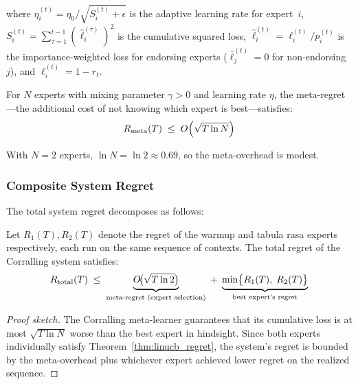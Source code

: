 where $\eta_i^{(t)} = \eta_0 / \sqrt{S_i^{(t)} + \epsilon}$ is the adaptive
learning rate for expert~$i$, $S_i^{(t)} = \sum_{\tau=1}^{t-1}
(\hat{\ell}_i^{(\tau)})^2$ is the cumulative squared loss,
$\hat{\ell}_i^{(t)} = \ell_i^{(t)} / p_i^{(t)}$ is the importance-weighted
loss for endorsing experts ($\hat{\ell}_j^{(t)} = 0$ for non-endorsing $j$),
and $\ell_i^{(t)} = 1 - r_t$.

\begin{theorem}
\label{thm:corralling_regret}
For $N$ experts with mixing parameter $\gamma > 0$ and learning rate $\eta$,
the meta-regret---the additional cost of not knowing which expert is
best---satisfies:
\begin{equation}
R_{\textnormal{meta}}(T)
\;\leq\; O\!\left(\sqrt{T \ln N}\right)
\label{eq:meta_bound}
\end{equation}
\end{theorem}

With $N = 2$ experts, $\ln N = \ln 2 \approx 0.69$, so the meta-overhead is
modest.

\subsubsection{Composite System Regret}

The total system regret decomposes as follows:

\begin{theorem}
\label{thm:composite}
Let $R_1(T), R_2(T)$ denote the regret of the warmup and tabula rasa experts
respectively, each run on the same sequence of contexts.  The total regret of
the Corralling system satisfies:
\begin{equation}
R_{\textnormal{total}}(T)
\;\leq\;
\underbrace{O\!\bigl(\sqrt{T \ln 2}\bigr)}_{\text{meta-regret (expert selection)}}
\;+\;
\underbrace{\min\bigl\{R_1(T),\; R_2(T)\bigr\}}_{\text{best expert's regret}}
\label{eq:composite_bound}
\end{equation}
\end{theorem}

\begin{proof}[Proof sketch]
The Corralling meta-learner guarantees that its cumulative loss is at most
$\sqrt{T \ln N}$ worse than the best expert in hindsight.  Since both experts
individually satisfy Theorem~\ref{thm:linucb_regret}, the system's regret is
bounded by the meta-overhead plus whichever expert achieved lower regret on the
realized sequence.
\end{proof}


